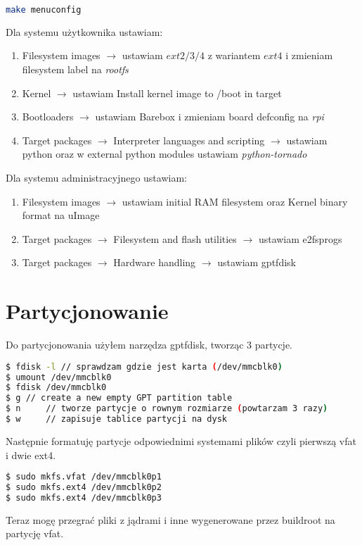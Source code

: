 \begin{lstlisting}[language=bash]
make menuconfig
\end{lstlisting}	

Dla systemu użytkownika ustawiam:
\begin{enumerate}
\item Filesystem images $\rightarrow$ ustawiam $ext2/3/4$ z wariantem $ext4$ i zmieniam filesystem label na \emph{rootfs}
\item Kernel $\rightarrow$ ustawiam Install kernel image to /boot in target
\item Bootloaders $\rightarrow$ ustawiam Barebox i zmieniam board defconfig na \emph{rpi}
\item Target packages $\rightarrow$ Interpreter languages and scripting $\rightarrow$ ustawiam python oraz w external python modules ustawiam \emph{python-tornado}
\end{enumerate}

Dla systemu administracyjnego ustawiam:
\begin{enumerate}
\item Filesystem images $\rightarrow$ ustawiam initial RAM filesystem oraz Kernel binary format na uImage
\item Target packages $\rightarrow$ Filesystem and flash utilities $\rightarrow$ ustawiam e2fsprogs
\item Target packages $\rightarrow$ Hardware handling $\rightarrow$ ustawiam gptfdisk 
\end{enumerate}

\section{Partycjonowanie}
Do partycjonowania użyłem narzędza gptfdisk, tworząc 3 partycje. 
\begin{lstlisting}[language=bash]
$ fdisk -l // sprawdzam gdzie jest karta (/dev/mmcblk0)
$ umount /dev/mmcblk0
$ fdisk /dev/mmcblk0
$ g	// create a new empty GPT partition table
$ n 	// tworze partycje o rownym rozmiarze (powtarzam 3 razy)
$ w 	// zapisuje tablice partycji na dysk
\end{lstlisting}	
Następnie formatuję partycje odpowiednimi systemami plików czyli pierwszą vfat i dwie ext4.
\begin{lstlisting}[language=bash]
$ sudo mkfs.vfat /dev/mmcblk0p1
$ sudo mkfs.ext4 /dev/mmcblk0p2
$ sudo mkfs.ext4 /dev/mmcblk0p3
\end{lstlisting}	
Teraz mogę przegrać pliki z jądrami i inne wygenerowane przez buildroot na partycję vfat.
